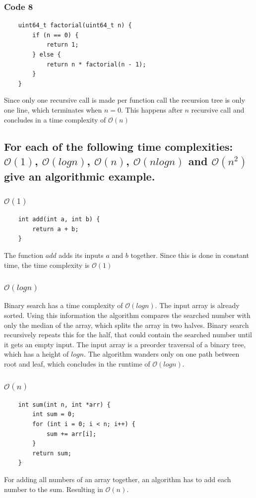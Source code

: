 \documentclass[runningheads]{llncs}
\begin{document}
\pagebreak
\subsubsection*{Code 8}
\begin{verbatim}
    uint64_t factorial(uint64_t n) {
        if (n == 0) {
            return 1;
        } else {
            return n * factorial(n - 1);
        }
    }
\end{verbatim}
Since only one recursive call is made per function call the recursion tree is only one line, which terminates when
$n = 0$. This happens after $n$ recursive call and concludes in a time complexity of $\mathcal{O}(n)$


\subsection*{For each of the following time complexities: $\mathcal{O}(1)$, $\mathcal{O}(log n)$, $\mathcal{O}(n)$,
    $\mathcal{O}(n log n)$ and $\mathcal{O}(n^2)$ give an algorithmic example.}

\subsubsection*{$\mathcal{O}(1)$}
\begin{verbatim}
    int add(int a, int b) {
        return a + b; 
    }
\end{verbatim}
The function $add$ adds its inputs $a$ and $b$ together. Since this is done in constant time, the time complexity is
$\mathcal{O}(1)$

\subsubsection*{$\mathcal{O}(log n)$}
Binary search has a time complexity of $\mathcal{O}(log n)$. The input array is already sorted. Using this information
the algorithm compares the searched number with only the median of the array, which splits the array in two halves.
Binary search recursively repeats this for the half, that could contain the searched number until it gets an empty
input. The input array is a preorder traversal of a binary tree, which has a height of $log n$. The algorithm wanders
only on one path between root and leaf, which concludes in the runtime of $\mathcal{O}(log n)$.

\subsubsection*{$\mathcal{O}(n)$}
\begin{verbatim}
    int sum(int n, int *arr) {
        int sum = 0;
        for (int i = 0; i < n; i++) {
            sum += arr[i];
        }
        return sum;
    }
\end{verbatim}
For adding all numbers of an array together, an algorithm has to add each number to the sum. Resulting in $\mathcal{O}(n)$.
\end{document}
